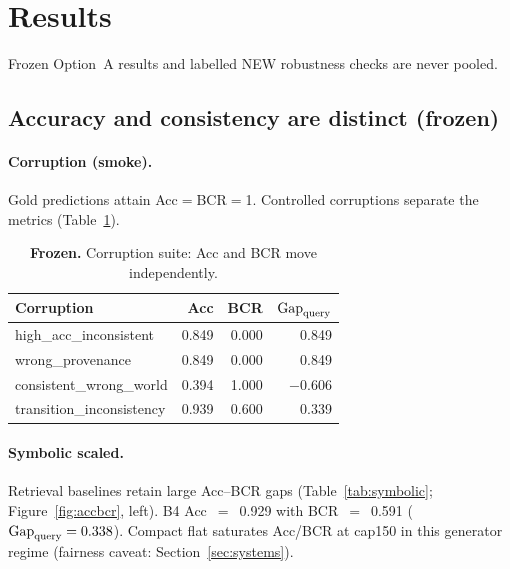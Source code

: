 \section{Results}
\label{sec:results}

Frozen Option~A results and labelled NEW robustness checks are never pooled.

\subsection{Accuracy and consistency are distinct (frozen)}

\paragraph{Corruption (smoke).} Gold predictions attain Acc$=$BCR$=$1. Controlled corruptions separate the metrics (Table~\ref{tab:corruption}).

\begin{table}[t]
\centering
\caption{\textbf{Frozen.} Corruption suite: Acc and BCR move independently.}
\label{tab:corruption}
\small
\begin{tabular}{lrrr}
\toprule
Corruption & Acc & BCR & $\mathrm{Gap}_{\mathrm{query}}$ \\
\midrule
high\_acc\_inconsistent & 0.849 & 0.000 & 0.849 \\
wrong\_provenance & 0.849 & 0.000 & 0.849 \\
consistent\_wrong\_world & 0.394 & 1.000 & $-$0.606 \\
transition\_inconsistency & 0.939 & 0.600 & 0.339 \\
\bottomrule
\end{tabular}
\end{table}

\paragraph{Symbolic scaled.} Retrieval baselines retain large Acc--BCR gaps (Table~\ref{tab:symbolic}; Figure~\ref{fig:accbcr}, left). B4 Acc~$=$~0.929 with BCR~$=$~0.591 ($\mathrm{Gap}_{\mathrm{query}}=0.338$). Compact flat saturates Acc/BCR at cap150 in this generator regime (fairness caveat: Section~\ref{sec:systems}).

